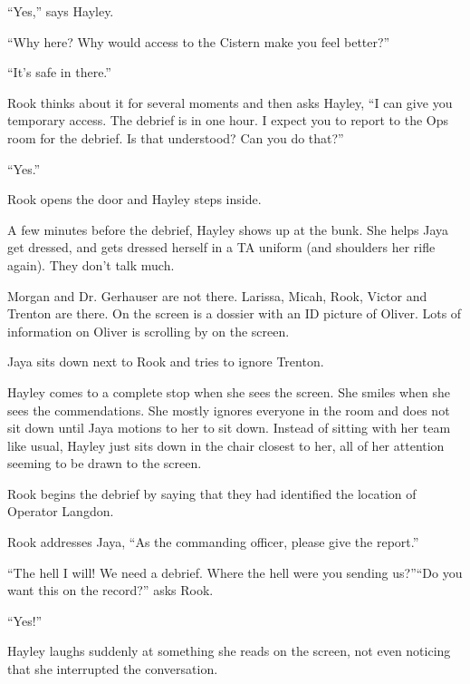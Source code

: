 ``Yes,'' says Hayley.

``Why here?  Why would access to the Cistern make you feel better?''

``It's safe in there.''

Rook thinks about it for several moments and then asks Hayley, ``I can give you temporary access.  The debrief is in one hour.  I expect you to report to the Ops room for the debrief.  Is that understood?  Can you do that?''

``Yes.''

Rook opens the door and Hayley steps inside.





A few minutes before the debrief, Hayley shows up at the bunk.  She helps Jaya get dressed, and gets dressed herself in a TA uniform (and shoulders her rifle again).  They don't talk much.





Morgan and Dr. Gerhauser are not there.  Larissa, Micah, Rook, Victor and Trenton are there.  On the screen is a dossier with an ID picture of Oliver.  Lots of information on Oliver is scrolling by on the screen.



Jaya sits down next to Rook and tries to ignore Trenton.



Hayley comes to a complete stop when she sees the screen.  She smiles when she sees the commendations.  She mostly ignores everyone in the room and does not sit down until Jaya motions to her to sit down.  Instead of sitting with her team like usual, Hayley just sits down in the chair closest to her, all of her attention seeming to be drawn to the screen.



Rook begins the debrief by saying that they had identified the location of Operator Langdon.  

Rook addresses Jaya, ``As the commanding officer, please give the report.'' 

``The hell I will!  We need a debrief.  Where the hell were you sending us?''``Do you want this on the record?'' asks Rook.

``Yes!''

Hayley laughs suddenly at something she reads on the screen, not even noticing that she interrupted the conversation.

